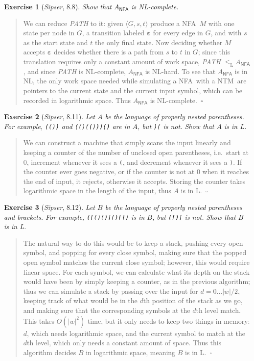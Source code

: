 \documentclass{article}
\theoremstyle{break}			%
\newtheorem{exercise}{Exercise}
\theoremstyle{plain}
\newenvironment{answer}{\begin{quotation}\noindent}{\end{quotation}}
\newcommand{\sipser}{\textit{Sipser}}
\newcommand{\encoding}[1]{\ensuremath{\langle#1\rangle}}
\renewcommand{\qed}{~\ensuremath{\square}}
\newcommand{\setname}[1]{\textit{#1}}
\newcommand{\NTM}{\textsf{NTM}}
\newcommand{\NFA}{\textsf{NFA}}
\newcommand{\emptystring}{\ensuremath{\boldsymbol\varepsilon}}
\newcommand{\sym}[1]{\texttt{#1}}
\begin{document}
\begin{exercise}[\sipser, 8.8]
Show that $A_{\NFA}$ is NL-complete.
\end{exercise}
\begin{answer}
We can reduce \setname{PATH} to it: given $\encoding{G,s,t}$ produce a
\NFA\ $M$ with one state per node in $G$, a transition labeled
$\emptystring$ for every edge in $G$, and with $s$ as the start state
and $t$ the only final state.  Now deciding whether $M$ accepts
$\emptystring$ decides whether there is a path from $s$ to $t$ in $G$;
since this translation requires only a constant amount of work space,
\setname{PATH} $\leq_{\text{L}} A_{\NFA}$, and since \setname{PATH} is
NL-complete, $A_{\NFA}$ is NL-hard.  To see that $A_{\NFA}$ is in NL,
the only work space needed while simulating a \NFA\ with a \NTM\ are
pointers to the current state and the current input symbol, which can
be recorded in logarithmic space.  Thus $A_{\NFA}$ is NL-complete.\qed
\end{answer}

\begin{exercise}[\sipser, 8.11]
Let $A$ be the language of properly nested parentheses.  For example,
\sym{(())} and \sym{(()(()))()} are in $A$, but \sym{)(} is
not.  Show that $A$ is in L.
\end{exercise}
\begin{answer}
We can construct a machine that simply scans the input linearly and
keeping a counter of the number of unclosed open parentheses,
i.e.~start at 0, increment whenever it sees a \sym(, and
decrement whenever it sees a \sym).  If the counter ever goes
negative, or if the counter is not at 0 when it reaches the end of
input, it rejects, otherwise it accepts.  Storing the counter takes
logarithmic space in the length of the input, thus $A$ is in L.\qed
\end{answer}

\begin{exercise}[\sipser, 8.12]
Let $B$ be the language of properly nested parentheses and brackets.
For example, \sym{([()()]()[])} is in $B$, but \sym{([)]} is
not.  Show that $B$ is in L.
\end{exercise}
\begin{answer}
The natural way to do this would be to keep a stack, pushing every
open symbol, and popping for every close symbol, making sure that the
popped open symbol matches the current close symbol; however, this
would require linear space.  For each symbol, we can calculate what
its depth on the stack would have been by simply keeping a counter, as
in the previous algorithm; thus we can simulate a stack by passing
over the input for $d = 0\ldots|w|/2$, keeping track of what would be
in the $d$th position of the stack as we go, and making sure that the
corresponding symbols at the $d$th level match.  This takes $O(|w|^2)$
time, but it only needs to keep two things in memory: $d$, which needs
logarithmic space, and the current symbol to match at the $d$th level,
which only needs a constant amount of space.  Thus this algorithm
decides $B$ in logarithmic space, meaning $B$ is in L.\qed
\end{answer}
\end{document}
